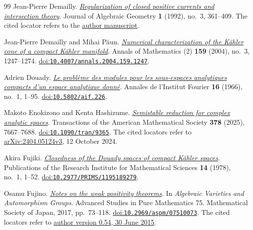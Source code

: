 \begin{thebibliography}{99}
Jean-Pierre Demailly.
\emph{\href{https://www-fourier.univ-grenoble-alpes.fr/~demailly/manuscripts/regularization.pdf}{Regularization of closed positive currents and intersection theory}}.
Journal of Algebraic Geometry \textbf{1} (1992), no.~3, 361--409.
The cited locator refers to the \href{https://www-fourier.univ-grenoble-alpes.fr/~demailly/manuscripts/regularization.pdf}{author manuscript}.

Jean-Pierre Demailly and Mihai P{\u{a}}un.
\emph{\href{https://annals.math.princeton.edu/2004/159-3/p05}{Numerical characterization of the {K{\"a}hler} cone of a compact {K{\"a}hler} manifold}}.
Annals of Mathematics (2) \textbf{159} (2004), no.~3, 1247--1274.
\href{https://doi.org/10.4007/annals.2004.159.1247}{doi:\nolinkurl{10.4007/annals.2004.159.1247}}.

Adrien Douady.
\emph{\href{https://www.numdam.org/item/AIF_1966__16_1_1_0/}{Le probl{\`e}me des modules pour les sous-espaces analytiques compacts d'un espace analytique donn{\'e}}}.
Annales de l'Institut Fourier \textbf{16} (1966), no.~1, 1--95.
\href{https://doi.org/10.5802/aif.226}{doi:\nolinkurl{10.5802/aif.226}}.

Makoto Enokizono and Kenta Hashizume.
\emph{\href{https://arxiv.org/abs/2404.05124v3}{Semistable reduction for complex analytic spaces}}.
Transactions of the American Mathematical Society \textbf{378} (2025), 7667--7688.
\href{https://doi.org/10.1090/tran/9365}{doi:\nolinkurl{10.1090/tran/9365}}.
The cited locators refer to \href{https://arxiv.org/abs/2404.05124v3}{arXiv:2404.05124v3}, 12 October 2024.

Akira Fujiki.
\emph{\href{https://ems.press/content/serial-article-files/41937}{Closedness of the {Douady} spaces of compact {K{\"a}hler} spaces}}.
Publications of the Research Institute for Mathematical Sciences \textbf{14} (1978), no.~1, 1--52.
\href{https://doi.org/10.2977/PRIMS/1195189279}{doi:\nolinkurl{10.2977/PRIMS/1195189279}}.

Osamu Fujino.
\emph{\href{https://www.math.kyoto-u.ac.jp/~fujino/weak-posi11.pdf}{Notes on the weak positivity theorems}}.
In \emph{Algebraic Varieties and Automorphism Groups}.
Advanced Studies in Pure Mathematics 75.
Mathematical Society of Japan, 2017, pp.~73--118.
\href{https://doi.org/10.2969/aspm/07510073}{doi:\nolinkurl{10.2969/aspm/07510073}}.
The cited locators refer to \href{https://www.math.kyoto-u.ac.jp/~fujino/weak-posi11.pdf}{author version 0.54, 30 June 2015}.


\end{thebibliography}
